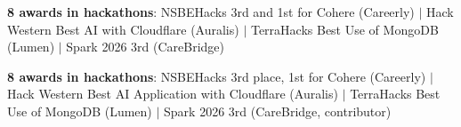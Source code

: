 \small{\item{\textbf{8 awards in \NHackathons{} hackathons}: NSBEHacks 3rd and 1st for Cohere (Careerly) $|$ Hack Western Best AI with Cloudflare (Auralis) $|$ TerraHacks Best Use of MongoDB (Lumen) $|$ Spark 2026 3rd (CareBridge)}}

\small{\item{\textbf{8 awards in \NHackathons{} hackathons}: NSBEHacks 3rd place, 1st for Cohere (Careerly) $|$ Hack Western Best AI Application with Cloudflare (Auralis) $|$ TerraHacks Best Use of MongoDB (Lumen) $|$ Spark 2026 3rd (CareBridge, contributor)}}
